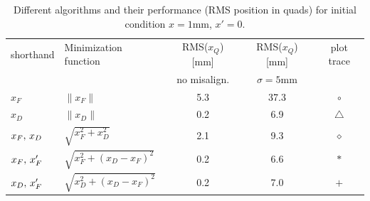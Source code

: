 \begin{table}[h]
\centering
\caption{Different algorithms and their performance (RMS position in quads) for initial condition $x=1$mm, $x'=0$. }
\label{tab:algorithm}
\begin{tabular}{|l|l|c|c|c|}
\hline
shorthand & Minimization function & RMS($x_Q$) [mm] & RMS($x_Q$) [mm]  & plot trace \\
& & no misalign. & $\sigma=5$mm & \\
\hline
$x_F$ & $\| x_F \|$ & 5.3 & 37.3 & {\color{blue} $\circ$} \\
$x_D$ & $\| x_D \|$ & 0.2 & 6.9 & {\color{red} $\triangle$} \\
$x_F,\thinspace x_D$ & $\sqrt{x_F^2+x_D^2}$ &  2.1 & 9.3 & {\color{cyan} $\diamond$} \\
$x_F,\thinspace x'_F$ & $\sqrt{x_F^2+(x_D-x_F)^2}$ & 0.2 & 6.6 & $\ast$ \\
$x_D,\thinspace x'_F$ & $\sqrt{x_D^2+(x_D-x_F)^2}$  & 0.2 & 7.0 & {\color{magenta} $+$} \\
\hline
\end{tabular}
\end{table}




